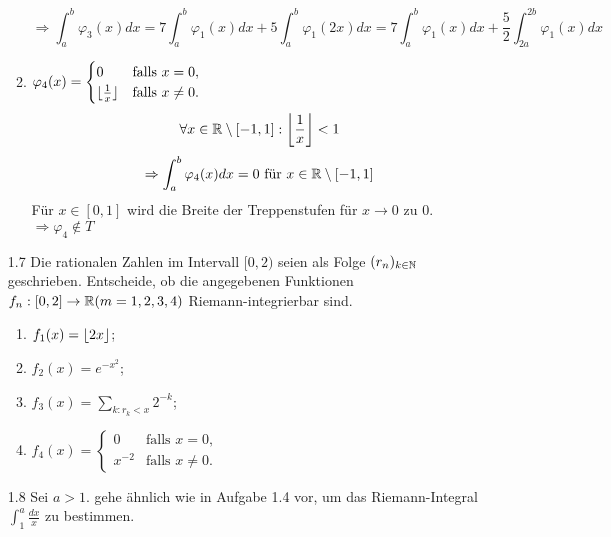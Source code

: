 \documentclass{HM}
\begin{document}
\begin{enumerate}
\begin{enumerate}
				$$\Rightarrow \int_a^b\varphi_3(x)dx=
				7\int_a^b\varphi_1(x)dx+5\int_a^b\varphi_1(2x)dx=
				7\int_a^b\varphi_1(x)dx+\frac{5}{2}\int_{2a}^{2b}\varphi_1(x)dx$$
			\item $\varphi_4(x)=\begin{cases}
				0&\text{falls }x=0,\\
				\floor{\frac{1}{x}}&\text{falls }x\neq 0.			
			\end{cases}$
			$$\forall x\in\R\setminus[-1,1]:\floor*{\frac{1}{x}}<1$$
			$$\Rightarrow \int_a^b\varphi_4(x)dx = 0 \text{ für } x\in\R\setminus[-1,1]$$
			Für $x\in[0,1]$ wird die Breite der Treppenstufen für $x\to 0$ zu $0$.\\
			$\Rightarrow \varphi_4\not\in T$
		\end{enumerate}
		
		\item[1.7] Die rationalen Zahlen im Intervall $[0,2)$ seien als Folge $(r_n)_{k\in\N}$ geschrieben. Entscheide, ob die angegebenen Funktionen $f_n:[0,2]\to\R(m=1,2,3,4)$ Riemann-integrierbar sind.
		\begin{enumerate}
			\item $f_1(x)=\floor{2x}$;
			\item $f_2(x)=e^{-x^{2}}$;
			\item $f_3(x)=\sum\limits_{k:r_k<x}2^{-k}$;
			\item $f_4(x)=\begin{cases}
				0&\text{falls }x=0,\\
				x^{-2}&\text{falls }x\neq 0.			
			\end{cases}$
		\end{enumerate}
		
		\item[1.8] Sei $a>1$. gehe ähnlich wie in Aufgabe 1.4 vor, um das Riemann-Integral $\int_1^a\frac{dx}{x}$ zu bestimmen.
	\end{enumerate}
\end{document}
